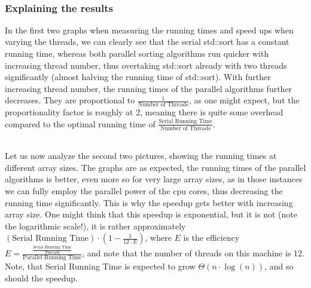 \documentclass[../../main.tex]{subfiles}
\begin{document}
~\\
\subsubsection{Explaining the results}
In the first two graphs when measuring the running times and speed ups when varying the threads, we can clearly see that the serial std::sort has a constant running time, whereas both parallel sorting algorithms run quicker with increasing thread number, thus overtaking std::sort already with two threads significantly (almost halving the running time of std::sort).
With further increasing thread number, the running times of the parallel algorithms further decreases.
They are proportional to $\frac{1}{\text{Number of Threads}}$, as one might expect, but the proportionality factor is roughly at 2, meaning there is quite some overhead compared to the optimal running time of $\frac{\text{Serial Running Time}}{\text{Number of Threads}}$.

~\\
Let us now analyze the second two pictures, showing the running times at different array sizes.
The graphs are as expected, the running times of the parallel algorithms is better, even more so for very large array sizes, as in those instances we can fully employ the parallel power of the cpu cores, thus decreasing the running time significantly.
This is why the speedup gets better with increasing array size.
One might think that this speedup is exponential, but it is not (note the logarithmic scale!), it is rather approximately $(\text{Serial Running Time}) \cdot (1 - \frac{1}{12 \cdot E})$, where $E$ is the efficiency $E = \frac{\frac{\text{Serial Running Time}}{\text{Threads}}}{\text{Parallel Running Time}}$, and note that the number of threads on this machine is 12.
Note, that Serial Running Time is expected to grow $\Theta(n \cdot \log(n))$, and so should the speedup.
\end{document}
